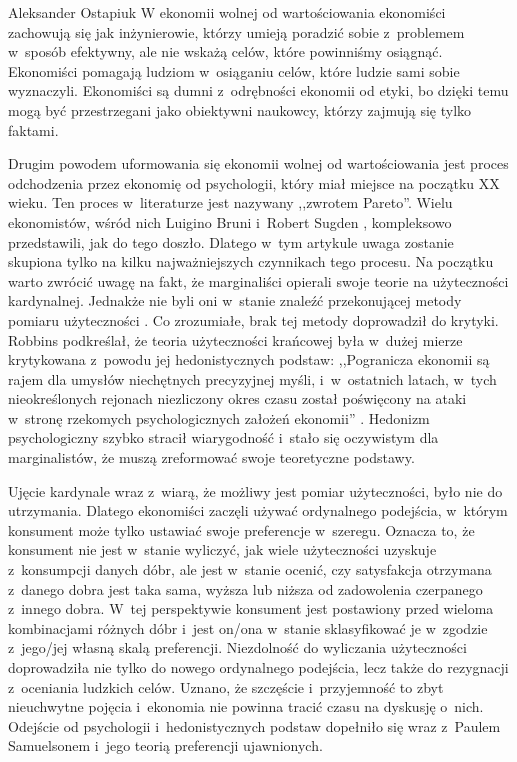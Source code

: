\begin{artplenv}{Aleksander Ostapiuk}
W ekonomii wolnej od wartościowania ekonomiści zachowują się jak inżynierowie, którzy umieją poradzić sobie z~problemem
w~sposób efektywny, ale nie wskażą celów, które powinniśmy osiągnąć. Ekonomiści pomagają ludziom w~osiąganiu celów,
które ludzie sami sobie wyznaczyli. Ekonomiści są dumni z~odrębności ekonomii od etyki, bo dzięki temu mogą być przestrzegani
jako obiektywni naukowcy, którzy zajmują się tylko faktami. 

Drugim powodem uformowania się ekonomii wolnej od wartościowania jest proces odchodzenia przez ekonomię od psychologii,
który miał miejsce na początku XX wieku. Ten proces w~literaturze jest nazywany ,,zwrotem Pareto''. Wielu ekonomistów,
wśród nich Luigino Bruni i~Robert Sugden
\parencite*{bruni_road_2007},
kompleksowo przedstawili, jak do tego doszło. Dlatego w~tym
artykule uwaga zostanie skupiona tylko na kilku najważniejszych czynnikach tego procesu. Na początku warto zwrócić
uwagę na fakt, że marginaliści opierali swoje teorie na użyteczności kardynalnej. Jednakże nie byli oni
w~stanie znaleźć przekonującej metody pomiaru użyteczności
\parencite{stigler_development_1950}.
Co zrozumiałe,
brak tej metody doprowadził do krytyki. Robbins podkreślał, że teoria użyteczności krańcowej była w~dużej mierze
krytykowana z~powodu jej hedonistycznych podstaw: ,,Pogranicza ekonomii są rajem dla umysłów niechętnych precyzyjnej
myśli, i~w~ostatnich latach, w~tych nieokreślonych rejonach niezliczony okres czasu został poświęcony na ataki w~stronę
rzekomych psychologicznych założeń ekonomii''
\parencite[s.~83]{robbins_essay_1935}.
Hedonizm psychologiczny
szybko stracił wiarygodność i~stało się oczywistym dla marginalistów, że muszą zreformować swoje teoretyczne podstawy. 

Ujęcie kardynale wraz z~wiarą, że możliwy jest pomiar użyteczności, było nie do utrzymania. Dlatego ekonomiści zaczęli używać
ordynalnego podejścia, w~którym konsument może tylko ustawiać swoje preferencje w~szeregu. Oznacza to, że konsument nie
jest w~stanie wyliczyć, jak wiele użyteczności uzyskuje z~konsumpcji danych dóbr, ale jest w~stanie ocenić, czy
satysfakcja otrzymana z~danego dobra jest taka sama, wyższa lub niższa od zadowolenia czerpanego z~innego dobra. W~tej
perspektywie konsument jest postawiony przed wieloma kombinacjami różnych dóbr i~jest on/ona w~stanie sklasyfikować je
w~zgodzie z~jego/jej własną skalą preferencji. Niezdolność do wyliczania użyteczności doprowadziła nie tylko do nowego
ordynalnego podejścia, lecz także do rezygnacji z~oceniania ludzkich celów. Uznano, że
szczęście i~przyjemność to zbyt nieuchwytne pojęcia i~ekonomia nie powinna tracić czasu na dyskusję o~nich.
Odejście od psychologii i~hedonistycznych podstaw dopełniło się wraz z~Paulem Samuelsonem i~jego teorią preferencji ujawnionych. 


\end{artplenv}
